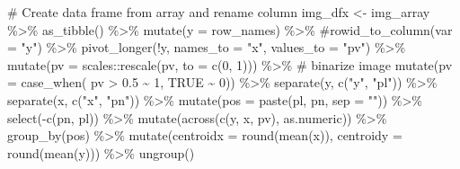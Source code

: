 \documentclass[
  letterpaper,
  DIV=11,
  numbers=noendperiod]{scrreprt}
\newenvironment{Shaded}{\begin{snugshade}}{\end{snugshade}}
\newcommand{\AttributeTok}[1]{\textcolor[rgb]{0.40,0.45,0.13}{#1}}
\newcommand{\CommentTok}[1]{\textcolor[rgb]{0.37,0.37,0.37}{#1}}
\newcommand{\ConstantTok}[1]{\textcolor[rgb]{0.56,0.35,0.01}{#1}}
\newcommand{\DecValTok}[1]{\textcolor[rgb]{0.68,0.00,0.00}{#1}}
\newcommand{\FloatTok}[1]{\textcolor[rgb]{0.68,0.00,0.00}{#1}}
\newcommand{\FunctionTok}[1]{\textcolor[rgb]{0.28,0.35,0.67}{#1}}
\newcommand{\NormalTok}[1]{\textcolor[rgb]{0.00,0.23,0.31}{#1}}
\newcommand{\OtherTok}[1]{\textcolor[rgb]{0.00,0.23,0.31}{#1}}
\newcommand{\SpecialCharTok}[1]{\textcolor[rgb]{0.37,0.37,0.37}{#1}}
\newcommand{\StringTok}[1]{\textcolor[rgb]{0.13,0.47,0.30}{#1}}
\begin{document}
\begin{Shaded}
\begin{Highlighting}[]
\CommentTok{\# Create data frame from array and rename column}
\NormalTok{img\_dfx }\OtherTok{\textless{}{-}}\NormalTok{ img\_array }\SpecialCharTok{\%\textgreater{}\%} 
  \FunctionTok{as\_tibble}\NormalTok{() }\SpecialCharTok{\%\textgreater{}\%} 
  \FunctionTok{mutate}\NormalTok{(}\AttributeTok{y =}\NormalTok{ row\_names) }\SpecialCharTok{\%\textgreater{}\%} 
  \CommentTok{\#rowid\_to\_column(var = "y") \%\textgreater{}\% }
  \FunctionTok{pivot\_longer}\NormalTok{(}\SpecialCharTok{!}\NormalTok{y, }\AttributeTok{names\_to =} \StringTok{"x"}\NormalTok{, }\AttributeTok{values\_to =} \StringTok{"pv"}\NormalTok{) }\SpecialCharTok{\%\textgreater{}\%} 
  \FunctionTok{mutate}\NormalTok{(}\AttributeTok{pv =}\NormalTok{ scales}\SpecialCharTok{::}\FunctionTok{rescale}\NormalTok{(pv, }\AttributeTok{to =} \FunctionTok{c}\NormalTok{(}\DecValTok{0}\NormalTok{, }\DecValTok{1}\NormalTok{))) }\SpecialCharTok{\%\textgreater{}\%} 
  \CommentTok{\# binarize image}
  \FunctionTok{mutate}\NormalTok{(}\AttributeTok{pv =} \FunctionTok{case\_when}\NormalTok{(}
\NormalTok{    pv }\SpecialCharTok{\textgreater{}} \FloatTok{0.5} \SpecialCharTok{\textasciitilde{}} \DecValTok{1}\NormalTok{,}
    \ConstantTok{TRUE} \SpecialCharTok{\textasciitilde{}} \DecValTok{0}\NormalTok{)) }\SpecialCharTok{\%\textgreater{}\%} 
  \FunctionTok{separate}\NormalTok{(y, }\FunctionTok{c}\NormalTok{(}\StringTok{"y"}\NormalTok{, }\StringTok{"pl"}\NormalTok{)) }\SpecialCharTok{\%\textgreater{}\%} 
  \FunctionTok{separate}\NormalTok{(x, }\FunctionTok{c}\NormalTok{(}\StringTok{"x"}\NormalTok{, }\StringTok{"pn"}\NormalTok{)) }\SpecialCharTok{\%\textgreater{}\%} 
  \FunctionTok{mutate}\NormalTok{(}\AttributeTok{pos =} \FunctionTok{paste}\NormalTok{(pl, pn, }\AttributeTok{sep =} \StringTok{""}\NormalTok{)) }\SpecialCharTok{\%\textgreater{}\%} 
  \FunctionTok{select}\NormalTok{(}\SpecialCharTok{{-}}\FunctionTok{c}\NormalTok{(pn, pl)) }\SpecialCharTok{\%\textgreater{}\%} 
  \FunctionTok{mutate}\NormalTok{(}\FunctionTok{across}\NormalTok{(}\FunctionTok{c}\NormalTok{(y, x, pv), as.numeric)) }\SpecialCharTok{\%\textgreater{}\%} 
  \FunctionTok{group\_by}\NormalTok{(pos) }\SpecialCharTok{\%\textgreater{}\%} 
  \FunctionTok{mutate}\NormalTok{(}\AttributeTok{centroidx =} \FunctionTok{round}\NormalTok{(}\FunctionTok{mean}\NormalTok{(x)), }\AttributeTok{centroidy =} \FunctionTok{round}\NormalTok{(}\FunctionTok{mean}\NormalTok{(y))) }\SpecialCharTok{\%\textgreater{}\%} 
  \FunctionTok{ungroup}\NormalTok{()}
\end{Highlighting}
\end{Shaded}
\end{document}
